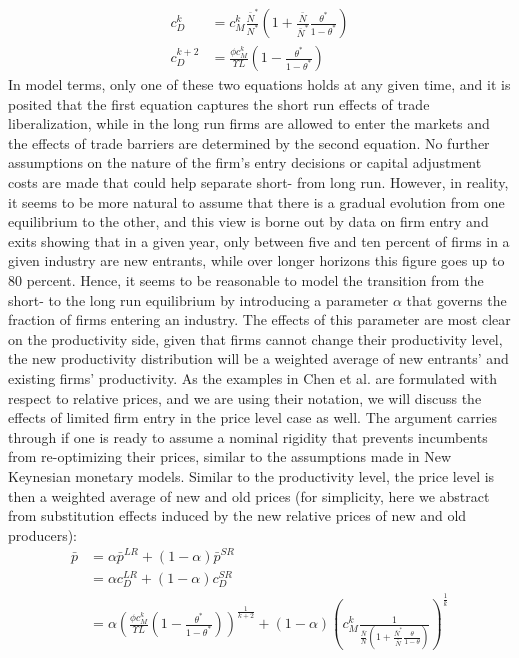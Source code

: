 \documentclass[a4paper,12pt]{article}
\begin{document}
\begin{align*}
c_D^k &= c_M^k \frac{\bar{N}^*}{N^*} \left( 1+ \frac{\bar{N}}{\bar{N}^*} \frac{\theta^*}{1-\theta^*} \right) \\
c_D^{k+2} &= \frac{\phi c_M^k}{\Upsilon L} \left(1- \frac{\theta^*}{1-\theta^*} \right)
\end{align*}
In model terms, only one of these two equations holds at any given time, and it is posited that the first equation captures the short run effects of trade liberalization, while in the long run firms are allowed to enter the markets and the effects of trade barriers are determined by the second equation. No further assumptions on the nature of the firm's entry decisions or capital adjustment costs are made that could help separate short- from long run. However, in reality, it seems to be more natural to assume that there is a gradual evolution from one equilibrium to the other, and this view is borne out by data on firm entry and exits showing that in a given year, only between five and ten percent of firms in a given industry are new entrants, while over longer horizons this figure goes up to 80 percent. Hence, it seems to be reasonable to model the transition from the short- to the long run equilibrium by introducing a parameter $\alpha$ that governs the fraction of firms entering an industry. The effects of this parameter are most clear on the productivity side, given that firms cannot change their productivity level, the new productivity distribution will be a weighted average of new entrants' and existing firms' productivity. As the examples in Chen et al. are formulated with respect to relative prices, and we are using their notation, we will discuss the effects of limited firm entry in the price level case as well. The argument carries through if one is ready to assume a nominal rigidity that prevents incumbents from re-optimizing their prices, similar to the assumptions made in New Keynesian monetary models. Similar to the productivity level, the price level is then a weighted average of new and old prices (for simplicity, here we abstract from substitution effects induced by the new relative prices of new and old producers):
\begin{align*}
\bar{p} &=\alpha \bar{p}^{LR} + (1-\alpha) \bar{p}^{SR} \\
				&=\alpha c_D^{LR} + (1-\alpha) c_D^{SR} \\
        &=\alpha \left( \frac{\phi c_M^k}{\Upsilon L} \left(1- \frac{\theta^*}{1-\theta^*}  \right) \right)^{\frac{1}{k+2}} + (1-\alpha) \left(c_M^k \frac{1}{ \frac{\bar{N}}{N}\left( 1+ \frac{\bar{N}^*}{\bar{N}} \frac{\theta}{1-\theta} \right) } \right)^{\frac{1}{k}}							
\end{align*}
\end{document}
